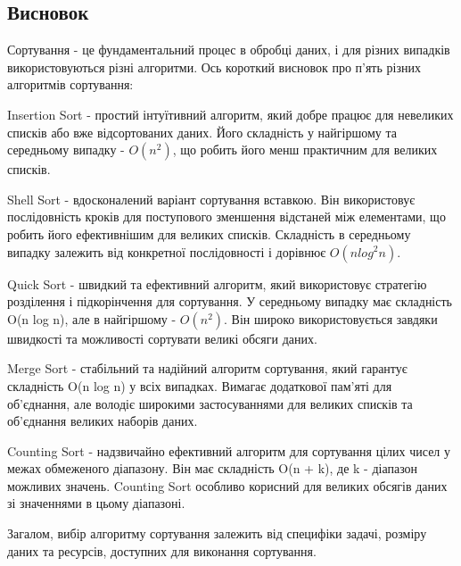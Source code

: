 \documentclass[12pt]{extarticle}
\begin{document}
\subsection*{Висновок} 
Сортування - це фундаментальний процес в обробці даних, і для різних випадків використовуються різні алгоритми. Ось короткий висновок про п'ять різних алгоритмів сортування:

Insertion Sort - простий інтуїтивний алгоритм, який добре працює для невеликих списків або вже відсортованих даних. Його складність у найгіршому та середньому випадку - $O(n^2)$, що робить його менш практичним для великих списків.

Shell Sort - вдосконалений варіант сортування вставкою. Він використовує послідовність кроків для поступового зменшення відстаней між елементами, що робить його ефективнішим для великих списків. Складність в середньому випадку залежить від конкретної послідовності і дорівнює $O(n log^2 n)$.

Quick Sort - швидкий та ефективний алгоритм, який використовує стратегію розділення і підкорінчення для сортування. У середньому випадку має складність O(n log n), але в найгіршому - $O(n^2)$. Він широко використовується завдяки швидкості та можливості сортувати великі обсяги даних.

Merge Sort - стабільний та надійний алгоритм сортування, який гарантує складність O(n log n) у всіх випадках. Вимагає додаткової пам'яті для об'єднання, але володіє широкими застосуваннями для великих списків та об'єднання великих наборів даних.

Counting Sort - надзвичайно ефективний алгоритм для сортування цілих чисел у межах обмеженого діапазону. Він має складність O(n + k), де k - діапазон можливих значень. Counting Sort особливо корисний для великих обсягів даних зі значеннями в цьому діапазоні.

Загалом, вибір алгоритму сортування залежить від специфіки задачі, розміру даних та ресурсів, доступних для виконання сортування.
\end{document}
